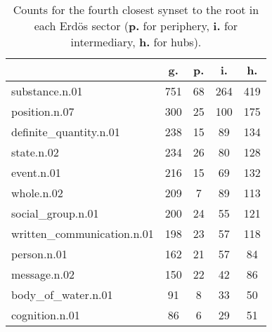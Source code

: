 \begin{table}[h!]
\begin{center}
\begin{tabular}{| l || c | c | c | c |}\hline
 & {\bf g.} & {\bf p.} & {\bf i.} & {\bf h.} \\\hline\hline
substance.n.01 & 751  & 68  & 264  & 419 \\\hline
position.n.07 & 300  & 25  & 100  & 175 \\\hline
definite\_quantity.n.01 & 238  & 15  & 89  & 134 \\\hline
state.n.02 & 234  & 26  & 80  & 128 \\\hline
event.n.01 & 216  & 15  & 69  & 132 \\\hline
whole.n.02 & 209  & 7  & 89  & 113 \\\hline
social\_group.n.01 & 200  & 24  & 55  & 121 \\\hline
written\_communication.n.01 & 198  & 23  & 57  & 118 \\\hline
person.n.01 & 162  & 21  & 57  & 84 \\\hline
message.n.02 & 150  & 22  & 42  & 86 \\\hline
body\_of\_water.n.01 & 91  & 8  & 33  & 50 \\\hline
cognition.n.01 & 86  & 6  & 29  & 51 \\\hline
\end{tabular}
\caption{Counts for the fourth closest synset to the root in each Erd\"os sector ({{\bf p.}} for periphery, {{\bf i.}} for intermediary, {{\bf h.}} for hubs).}
\end{center}
\end{table}
